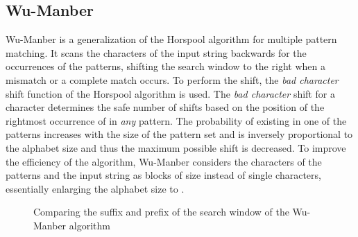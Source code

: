 \documentclass{ws-ijait}
\begin{document}
\subsection{Wu-Manber}

Wu-Manber is a generalization of the Horspool algorithm for multiple pattern matching. It scans the characters of the input string backwards for the occurrences of the patterns, shifting the search window to the right when a mismatch or a complete match occurs. To perform the shift, the \textit{bad character} shift function of the Horspool algorithm is used. The \textit{bad character} shift for a character  determines the safe number of shifts based on the position of the rightmost occurrence of  in \textit{any} pattern. The probability of  existing in one of the patterns increases with the size of the pattern set and is inversely proportional to the alphabet size and thus the maximum possible shift is decreased. To improve the efficiency of the algorithm, Wu-Manber considers the characters of the patterns and the input string as blocks of size  instead of single characters, essentially enlarging the alphabet size to .

\begin{figure}[h]
\centering
{}
  \caption{Comparing the suffix and prefix of the search window of the Wu-Manber algorithm}
  \label{fig:wu_manber_border}
\end{figure}
\end{document}
